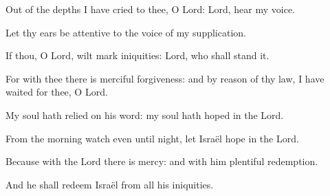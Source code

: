 \item Out of the depths I have cried to thee, O Lord: Lord, hear my voice.
\item Let thy ears be attentive to the voice of my supplication.
\item If thou, O Lord, wilt mark iniquities: Lord, who shall stand it.
\item For with thee there is merciful forgiveness: and by reason of thy law, I have waited for thee, O Lord.
\item My soul hath relied on his word: my soul hath hoped in the Lord.
\item From the morning watch even until night, let Israël hope in the Lord.
\item Because with the Lord there is mercy: and with him plentiful redemption.
\item And he shall redeem Israël from all his iniquities.